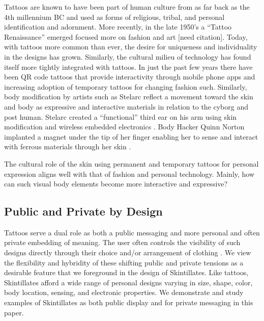 \documentclass{sigchi}
\begin{document}
Tattoos are known to have been part of human culture from as far back as the 4th millennium BC \cite{Grognard:o1z3U5M2}and used as forms of religious, tribal, and personal identification and adornment.  More recently, in the late 1950’s a “Tattoo Renaissance” emerged focused more on fashion and art [need citation]. Today, with tattoos more common than ever, the desire for uniqueness and individuality in the designs has grown.  Similarly, the cultural milieu of technology has found itself more tightly integrated with tattoos. In just the past few years there have been QR code tattoos that provide interactivity through mobile phone apps and increasing adoption of temporary tattoos for changing fashion such\cite{ByCourtneyRubin:tj,Fanning:v_9LfC8A}. 
Similarly, body modification by artists such as Stelarc reflect a movement toward the skin and body as expressive and interactive materials in relation to the cyborg and post human.  Stelarc created a “functional” third ear on his arm using skin modification and wireless embedded electronics \cite{Stelarc:5Hvf9Mel}.  Body Hacker Quinn Norton implanted a magnet under the tip of her finger enabling her to sense and interact with ferrous materials through her skin \cite{Norton:OK5Z52w0}.

The cultural role of the skin using permanent and temporary tattoos for personal expression aligns well with that of fashion and personal technology.  Mainly, how can such visual body elements become more interactive and expressive?

\subsection{Public and Private by Design}
Tattoos serve a dual role as both a public messaging and more personal and often private embedding of meaning.  The user often controls the visibility of such designs directly through their choice and/or arrangement of clothing \cite{Doss:2009ee,McLeod:2014ua}. We view the flexibility and hybridity of these shifting public and private tensions as a desirable feature that we foreground in the design of Skintillates.   Like tattoos, Skintillates afford a wide range of personal designs varying in size, shape, color, body location, sensing, and electronic properties. We demonstrate and study examples of Skintillates as both public display and for private messaging in this paper. 
\end{document}
